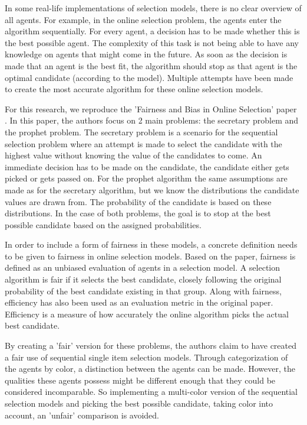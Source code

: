 In some real-life implementations of selection models, there is no clear overview of all agents. For example, in the online selection problem, the agents enter the algorithm sequentially. For every agent, a decision has to be made whether this is the best possible agent. The complexity of this task is not being able to have any knowledge on agents that might come in the future. As soon as the decision is made that an agent is the best fit, the algorithm should stop as that agent is the optimal candidate (according to the model). Multiple attempts have been made to create the most accurate algorithm for these online selection models.

For this research, we reproduce the 'Fairness and Bias in Online Selection' paper \citep{correa2021fairness}. In this paper, the authors focus on 2 main problems: the secretary problem and the prophet problem. The secretary problem is a scenario for the sequential selection problem where an attempt is made to select the candidate with the highest value without knowing the value of the candidates to come. An immediate decision has to be made on the candidate, the candidate either gets picked or gets passed on. For the prophet algorithm the same assumptions are made as for the secretary algorithm, but we know the distributions the candidate values are drawn from. The probability of the candidate is based on these distributions. In the case of both problems, the goal is to stop at the best possible candidate based on the assigned probabilities.

In order to include a form of fairness in these models, a concrete definition needs to be given to fairness in online selection models. Based on the \citep{correa2021fairness} paper, fairness is defined as an unbiased evaluation of agents in a selection model. A selection algorithm is fair if it selects the best candidate, closely following the original probability of the best candidate existing in that group. Along with fairness, efficiency has also been used as an evaluation metric in the original paper. Efficiency is a measure of how accurately the online algorithm picks the actual best candidate.

By creating a 'fair' version for these problems, the authors claim to have created a fair use of sequential single item selection models. Through categorization of the agents by color, a distinction between the agents can be made. However, the qualities these agents possess might be different enough that they could be considered incomparable. So implementing a multi-color version of the sequential selection models and picking the best possible candidate, taking color into account, an 'unfair' comparison is avoided.

